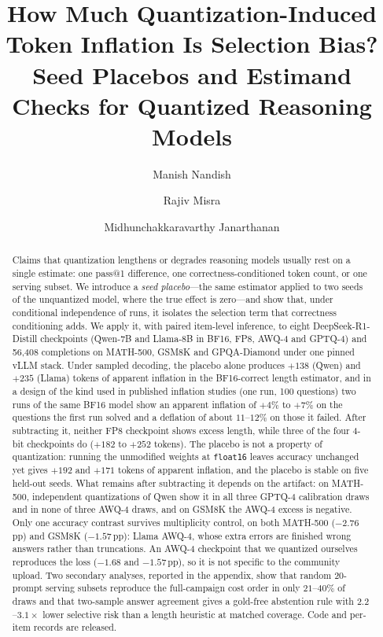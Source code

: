 \documentclass[11pt,a4paper]{article}
\title{\textbf{How Much Quantization-Induced Token Inflation Is Selection Bias? Seed Placebos and Estimand Checks for Quantized Reasoning Models}}
\author[1,2]{Manish Nandish}
\author[1]{Rajiv Misra}
\author[2]{Midhunchakkaravarthy Janarthanan}
\affil[1]{Department of Computer Science and Engineering, Indian Institute of Technology Patna, Patna, Bihar, India\\
\texttt{manish\_25s21res58@iitp.ac.in}, \texttt{rajivm@iitp.ac.in}}
\affil[2]{Lincoln University College, Malaysia\\
\texttt{midhun@lincoln.edu.my}}
\date{}
\begin{document}
\maketitle

\begin{abstract}
Claims that quantization lengthens or degrades reasoning models usually rest on a single estimate: one pass@1 difference, one correctness-conditioned token count, or one serving subset. We introduce a \emph{seed placebo}---the same estimator applied to two seeds of the unquantized model, where the true effect is zero---and show that, under conditional independence of runs, it isolates the selection term that correctness conditioning adds. We apply it, with paired item-level inference, to eight DeepSeek-R1-Distill checkpoints (Qwen-7B and Llama-8B in BF16, FP8, AWQ-4 and GPTQ-4) and 56{,}408 completions on MATH-500, GSM8K and GPQA-Diamond under one pinned vLLM stack. Under sampled decoding, the placebo alone produces $+138$ (Qwen) and $+235$ (Llama) tokens of apparent inflation in the BF16-correct length estimator, and in a design of the kind used in published inflation studies (one run, 100 questions) two runs of the same BF16 model show an apparent inflation of $+4\%$ to $+7\%$ on the questions the first run solved and a deflation of about $11$--$12\%$ on those it failed. After subtracting it, neither FP8 checkpoint shows excess length, while three of the four 4-bit checkpoints do ($+182$ to $+252$ tokens). The placebo is not a property of quantization: running the unmodified weights at \texttt{float16} leaves accuracy unchanged yet gives $+192$ and $+171$ tokens of apparent inflation, and the placebo is stable on five held-out seeds. What remains after subtracting it depends on the artifact: on MATH-500, independent quantizations of Qwen show it in all three GPTQ-4 calibration draws and in none of three AWQ-4 draws, and on GSM8K the AWQ-4 excess is negative. Only one accuracy contrast survives multiplicity control, on both MATH-500 ($-2.76$\,pp) and GSM8K ($-1.57$\,pp): Llama AWQ-4, whose extra errors are finished wrong answers rather than truncations. An AWQ-4 checkpoint that we quantized ourselves reproduces the loss ($-1.68$ and $-1.57$\,pp), so it is not specific to the community upload. Two secondary analyses, reported in the appendix, show that random 20-prompt serving subsets reproduce the full-campaign cost order in only $21$--$40\%$ of draws and that two-sample answer agreement gives a gold-free abstention rule with $2.2$--$3.1\times$ lower selective risk than a length heuristic at matched coverage. Code and per-item records are released.
\end{abstract}
\end{document}
